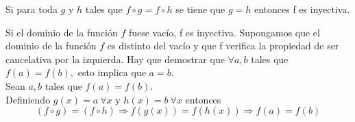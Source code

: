 \begin{isabellebody}
\begin{isamarkuptext}
\begin {lema} 
Si para toda $g$ y $h$ tales que $f \circ g =  f \circ h$ se tiene que $g
= h$ entonces f es inyectiva.
\end {lema} 

\begin {demostracion}
Si el dominio de la función $f$ fuese vacío, f  es inyectiva.
Supongamos que el dominio de la función $f$ es distinto del vacío y que 
f verifica la propiedad de ser cancelativa por la izquierda.
Hay que demostrar que $\forall a,b$ tales que $f(a) = f(b),$ esto
 implica que $a = b.$ \\
Sean $a,b$ tales que $f(a) = f(b)$. \\
Definiendo  $g(x) = a  \ \forall x$  y $h(x) = b \  \forall x$ entonces 
$$(f \circ g) = (f \circ h) \Longrightarrow  f(g(x)) = f(h(x))
 \Longrightarrow f(a) = f(b)$$


\end{demostracion}
\end{isamarkuptext}
\end{isabellebody}

